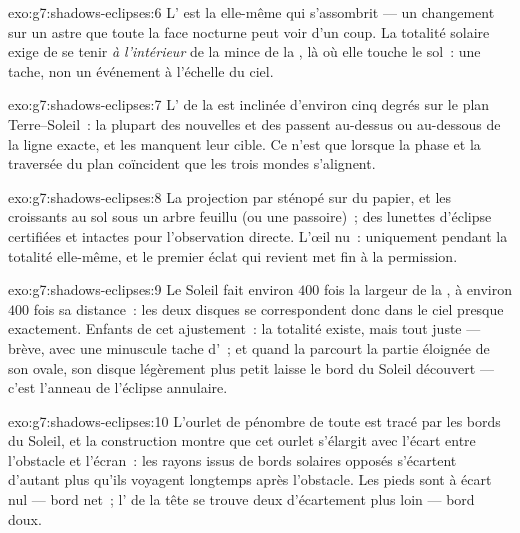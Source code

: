 \begin{solution}{exo:g7:shadows-eclipses:6}
L' est la  elle-même qui s'assombrit --- un
changement sur un astre que toute la face nocturne peut voir d'un
coup. La totalité solaire exige de se tenir \emph{à l'intérieur} de
la mince  de la , là où elle touche le sol~: une
tache, non un événement à l'échelle du ciel.
\end{solution}

\begin{solution}{exo:g7:shadows-eclipses:7}
L' de la  est inclinée d'environ cinq degrés sur le plan
Terre--Soleil~: la plupart des nouvelles et des  passent
au-dessus ou au-dessous de la ligne exacte, et les  manquent
leur cible. Ce n'est que lorsque la phase et la traversée du plan
coïncident que les trois mondes s'alignent.
\end{solution}

\begin{solution}{exo:g7:shadows-eclipses:8}
La projection par sténopé sur du papier, et les croissants au sol
sous un arbre feuillu (ou une passoire)~; des lunettes d'éclipse
certifiées et intactes pour l'observation directe. L'œil nu~:
uniquement pendant la totalité elle-même, et le premier éclat qui
revient met fin à la permission.
\end{solution}

\begin{solution}{exo:g7:shadows-eclipses:9}
Le Soleil fait environ $400$ fois la largeur de la , à environ
$400$ fois sa distance~: les deux disques se correspondent donc dans
le ciel presque exactement. Enfants de cet ajustement~: la totalité
existe, mais tout juste --- brève, avec une minuscule tache
d'~; et quand la  parcourt la partie éloignée de son 
ovale, son disque légèrement plus petit laisse le bord du Soleil
découvert --- c'est l'anneau de l'éclipse annulaire.
\end{solution}

\begin{solution}{exo:g7:shadows-eclipses:10}
L'ourlet de pénombre de toute  est tracé par les bords du
Soleil, et la construction montre que cet ourlet s'élargit avec
l'écart entre l'obstacle et l'écran~: les rayons issus de bords
solaires opposés s'écartent d'autant plus qu'ils voyagent longtemps
après l'obstacle. Les pieds sont à écart nul --- bord net~; l'
de la tête se trouve deux  d'écartement plus loin --- bord
doux.
\end{solution}

